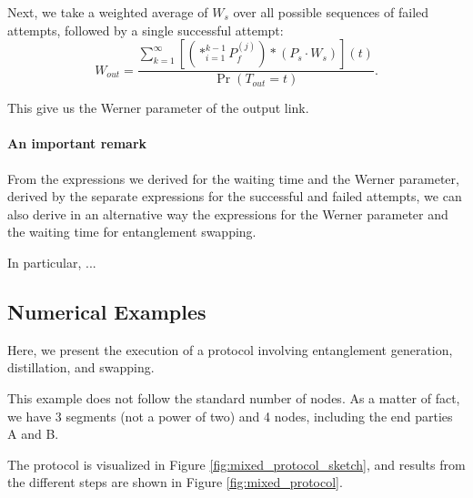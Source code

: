 \documentclass{masterthesis}
\begin{document}
Next, we take a weighted average of $W_s$ over all possible sequences of failed attempts, followed by a single successful attempt:
\begin{equation}\label{eq:werner_parameter_distillation}
    W_{out} = \frac{\sum_{k=1}^{\infty} \left[ \left( \ast_{i=1}^{k-1} P_f^{(j)} \right) \ast (P_s \cdot W_s) \right] (t)}{\Pr(T_{out} = t)}.
\end{equation}

This give us the Werner parameter of the output link.

\paragraph*{An important remark} From the expressions we derived for the waiting time and the Werner parameter, derived by the separate expressions for the successful and failed attempts, we can also derive in an alternative way the expressions for the Werner parameter and the waiting time for entanglement swapping.

In particular, ... %


\subsection*{Numerical Examples}

Here, we present the execution of a protocol involving entanglement generation, distillation, and swapping.

This example does not follow the standard number of nodes. As a matter of fact, we have 3 segments (not a power of two) and 4 nodes, including the end parties A and B.

The protocol is visualized in Figure \ref{fig:mixed_protocol_sketch}, and results from the different steps are shown in Figure \ref{fig:mixed_protocol}.
\end{document}

